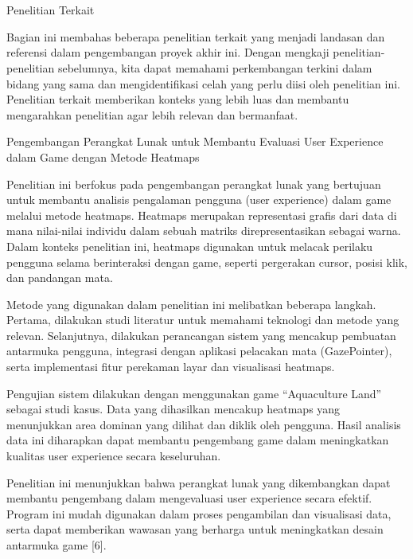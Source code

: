 \chapter{\babDua}
\label{bab:2}
Penelitian Terkait

Bagian ini membahas beberapa penelitian terkait yang menjadi landasan dan referensi dalam pengembangan proyek akhir ini. Dengan mengkaji penelitian-penelitian sebelumnya, kita dapat memahami perkembangan terkini dalam bidang yang sama dan mengidentifikasi celah yang perlu diisi oleh penelitian ini. Penelitian terkait memberikan konteks yang lebih luas dan membantu mengarahkan penelitian agar lebih relevan dan bermanfaat.

Pengembangan Perangkat Lunak untuk Membantu Evaluasi User Experience dalam Game dengan Metode Heatmaps

Penelitian ini berfokus pada pengembangan perangkat lunak yang bertujuan untuk membantu analisis pengalaman pengguna (user experience) dalam game melalui metode heatmaps. Heatmaps merupakan representasi grafis dari data di mana nilai-nilai individu dalam sebuah matriks direpresentasikan sebagai warna. Dalam konteks penelitian ini, heatmaps digunakan untuk melacak perilaku pengguna selama berinteraksi dengan game, seperti pergerakan cursor, posisi klik, dan pandangan mata.

Metode yang digunakan dalam penelitian ini melibatkan beberapa langkah. Pertama, dilakukan studi literatur untuk memahami teknologi dan metode yang relevan. Selanjutnya, dilakukan perancangan sistem yang mencakup pembuatan antarmuka pengguna, integrasi dengan aplikasi pelacakan mata (GazePointer), serta implementasi fitur perekaman layar dan visualisasi heatmaps.

Pengujian sistem dilakukan dengan menggunakan game “Aquaculture Land” sebagai studi kasus. Data yang dihasilkan mencakup heatmaps yang menunjukkan area dominan yang dilihat dan diklik oleh pengguna. Hasil analisis data ini diharapkan dapat membantu pengembang game dalam meningkatkan kualitas user experience secara keseluruhan.

Penelitian ini menunjukkan bahwa perangkat lunak yang dikembangkan dapat membantu pengembang dalam mengevaluasi user experience secara efektif. Program ini mudah digunakan dalam proses pengambilan dan visualisasi data, serta dapat memberikan wawasan yang berharga untuk meningkatkan desain antarmuka game ​​[6].

